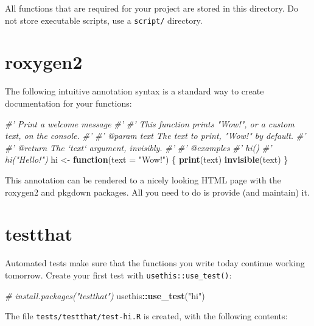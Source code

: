 \documentclass[]{book}
\newenvironment{Shaded}{\begin{snugshade}}{\end{snugshade}}
\newcommand{\CommentTok}[1]{\textcolor[rgb]{0.56,0.35,0.01}{\textit{#1}}}
\newcommand{\ControlFlowTok}[1]{\textcolor[rgb]{0.13,0.29,0.53}{\textbf{#1}}}
\newcommand{\DataTypeTok}[1]{\textcolor[rgb]{0.13,0.29,0.53}{#1}}
\newcommand{\KeywordTok}[1]{\textcolor[rgb]{0.13,0.29,0.53}{\textbf{#1}}}
\newcommand{\NormalTok}[1]{#1}
\newcommand{\OperatorTok}[1]{\textcolor[rgb]{0.81,0.36,0.00}{\textbf{#1}}}
\newcommand{\StringTok}[1]{\textcolor[rgb]{0.31,0.60,0.02}{#1}}
\begin{document}
All functions that are required for your project are stored in this directory.
Do not store executable scripts, use a \texttt{script/} directory.

\hypertarget{roxygen2}{%
\section{roxygen2}\label{roxygen2}}

The following intuitive annotation syntax is a standard way to create documentation for your functions:

\begin{Shaded}
\begin{Highlighting}[]
\CommentTok{#' Print a welcome message}
\CommentTok{#' }
\CommentTok{#' This function prints "Wow!", or a custom text, on the console.}
\CommentTok{#'}
\CommentTok{#' @param text The text to print, "Wow!" by default.}
\CommentTok{#' }
\CommentTok{#' @return The `text` argument, invisibly.}
\CommentTok{#' }
\CommentTok{#' @examples}
\CommentTok{#' hi()}
\CommentTok{#' hi("Hello!")}
\NormalTok{hi <-}\StringTok{ }\ControlFlowTok{function}\NormalTok{(}\DataTypeTok{text =} \StringTok{"Wow!"}\NormalTok{) \{}
  \KeywordTok{print}\NormalTok{(text)}
  \KeywordTok{invisible}\NormalTok{(text)}
\NormalTok{\}}
\end{Highlighting}
\end{Shaded}

This annotation can be rendered to a nicely looking HTML page with the roxygen2 and pkgdown packages.
All you need to do is provide (and maintain) it.

\hypertarget{testthat}{%
\section{testthat}\label{testthat}}

Automated tests make sure that the functions you write today continue working tomorrow.
Create your first test with \texttt{usethis::use\_test()}:

\begin{Shaded}
\begin{Highlighting}[]
\CommentTok{# install.packages("testthat")}
\NormalTok{usethis}\OperatorTok{::}\KeywordTok{use_test}\NormalTok{(}\StringTok{"hi"}\NormalTok{)}
\end{Highlighting}
\end{Shaded}

The file \texttt{tests/testthat/test-hi.R} is created, with the following contents:
\end{document}

